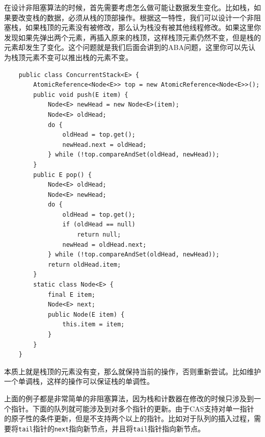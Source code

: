 \documentclass[a4paper, 11pt]{ctexart}
\begin{document}
在设计非阻塞算法的时候，首先需要考虑怎么做可能让数据发生变化。比如栈，如果要改变栈的数据，必须从栈的顶部操作。根据这一特性，我们可以设计一个非阻塞栈，如果栈顶的元素没有被修改，那么认为栈没有被其他线程修改。如果这里你发现如果先弹出两个元素，再插入原来的栈顶，这样栈顶元素仍然不变，但是栈的元素却发生了变化。这个问题就是我们后面会讲到的ABA问题，这里你可以先认为栈顶元素不变可以推出栈的元素不变。
\begin{lstlisting}
    public class ConcurrentStack<E> {
        AtomicReference<Node<E>> top = new AtomicReference<Node<E>>();
        public void push(E item) {
            Node<E> newHead = new Node<E>(item);
            Node<E> oldHead;
            do {
                oldHead = top.get();
                newHead.next = oldHead;
            } while (!top.compareAndSet(oldHead, newHead));
        }
        public E pop() {
            Node<E> oldHead;
            Node<E> newHead;
            do {
                oldHead = top.get();
                if (oldHead == null)
                    return null;
                newHead = oldHead.next;
            } while (!top.compareAndSet(oldHead, newHead));
            return oldHead.item;
        }
        static class Node<E> {
            final E item;
            Node<E> next;
            public Node(E item) {
                this.item = item;
            }
        }
    }
\end{lstlisting}

本质上就是栈顶的元素没有变，那么就保持当前的操作，否则重新尝试。比如维护一个单调栈，这样的操作可以保证栈的单调性。

上面的例子都是非常简单的非阻塞算法，因为栈和计数器在修改的时候只涉及到一个指针。下面的队列就可能涉及到对多个指针的更新。由于CAS支持对单一指针的原子性的条件更新，但是不支持两个以上的指针。比如对于队列的插入过程，需要将\lstinline|tail|指针的\lstinline|next|指向新节点，并且将\lstinline|tail|指针指向新节点。
\end{document}
